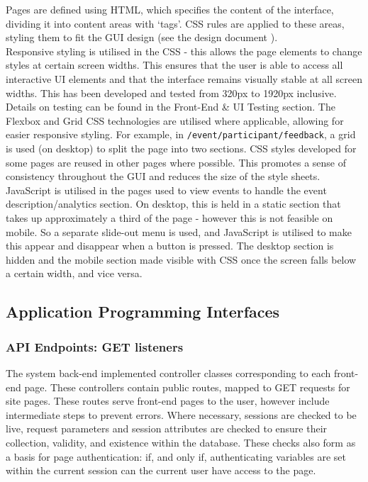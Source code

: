 \documentclass[9pt, titlepage]{extarticle}
\begin{document}
Pages are defined using HTML, which specifies the content of the interface, dividing it into content areas with `tags'. CSS rules are applied to these areas, styling them to fit the GUI design (see the design document \cite{design-and-planning}).\\

Responsive styling is utilised in the CSS - this allows the page elements to change styles at certain screen widths. This ensures that the user is able to access all interactive UI elements and that the interface remains visually stable at all screen widths. This has been developed and tested from 320px to 1920px inclusive. Details on testing can be found in the Front-End \& UI Testing section. The Flexbox and Grid CSS technologies are utilised where applicable, allowing for easier responsive styling. For example, in \texttt{/event/participant/feedback}, a grid is used (on desktop) to split the page into two sections. CSS styles developed for some pages are reused in other pages where possible. This promotes a sense of consistency throughout the GUI and reduces the size of the style sheets.\\

JavaScript is utilised in the pages used to view events to handle the event description/analytics section. On desktop, this is held in a static section that takes up approximately a third of the page - however this is not feasible on mobile. So a separate slide-out menu is used, and JavaScript is utilised to make this appear and disappear when a button is pressed. The desktop section is hidden and the mobile section made visible with CSS once the screen falls below a certain width, and vice versa.\\

\subsection{Application Programming Interfaces}

\subsubsection{API Endpoints: GET listeners}

The system back-end implemented controller classes corresponding to each front-end page. These controllers contain public routes, mapped to GET requests for site pages. These routes serve front-end pages to the user, however include intermediate steps to prevent errors. Where necessary, sessions are checked to be live, request parameters and session attributes are checked to ensure their collection, validity, and existence within the database. These checks also form as a basis for page authentication: if, and only if, authenticating variables are set within the current session can the current user have access to the page. \\
\end{document}
